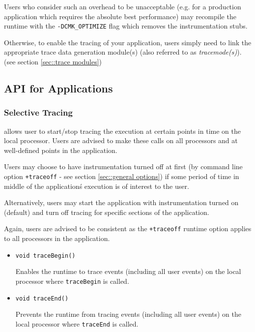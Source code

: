 \documentclass[10pt]{article}
\begin{document}
Users who consider such an overhead to be unacceptable (e.g. for a
production application which requires the absolute best performance)
may recompile the \charmpp{} runtime with the {\tt -DCMK\_OPTIMIZE}
flag which removes the instrumentation stubs.

Otherwise, to enable the tracing of your application, users simply
need to link the appropriate trace data generation module(s) (also
referred to as {\em tracemode(s)}). (see section \ref{sec::trace modules})

\subsection{\projections{} API for \charmpp{} Applications}
\label{sec::api}

\subsubsection{Selective Tracing}
\label{sec::selective tracing}

\charmpp{} allows user to start/stop tracing the execution at certain
points in time on the local processor. Users are advised to make these
calls on all processors and at well-defined points in the application.

Users may choose to have instrumentation turned off at first (by
command line option {\tt +traceoff} - see section \ref{sec::general options}) if some period of time in middle of the
application\'s execution is of interest to the user.

Alternatively, users may start the application with instrumentation
turned on (default) and turn off tracing for specific sections of the
application.

Again, users are advised to be consistent as the {\tt +traceoff}
runtime option applies to all processors in the application.

\begin{itemize}
\item
{\tt void traceBegin()}

Enables the runtime to trace events (including all user events) on the local processor where {\tt traceBegin} is called.

\item
{\tt void traceEnd()}

Prevents the runtime from tracing events (including all user events) on the local processor where {\tt traceEnd} is called.

\end{itemize}
\end{document}
